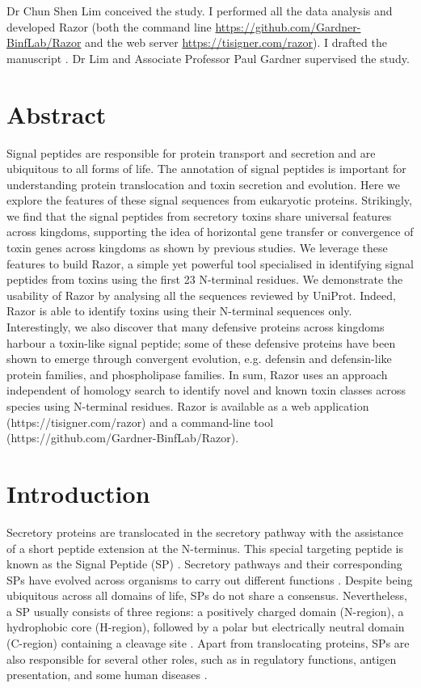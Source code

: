 Dr Chun Shen Lim conceived the study. I performed all the data analysis and developed Razor (both the command line \href{https://github.com/Gardner-BinfLab/Razor}{https://github.com/Gardner-BinfLab/Razor} and the web server \href{https://tisigner.com/razor}{https://tisigner.com/razor}). I drafted the manuscript \cite{Bhandari2020-oj}. Dr Lim and Associate Professor Paul Gardner supervised the study.

\section{Abstract}
Signal peptides are responsible for protein transport and secretion and are ubiquitous to all forms of life. The annotation of signal peptides is important for understanding protein translocation and toxin secretion and evolution. Here we explore the features of these signal sequences from eukaryotic proteins. Strikingly, we find that the signal peptides from secretory toxins share universal features across kingdoms, supporting the idea of horizontal gene transfer or convergence of toxin genes across kingdoms as shown by previous studies. We leverage these features to build Razor, a simple yet powerful tool specialised in identifying signal peptides from toxins using the first 23 N-terminal residues. We demonstrate the usability of Razor by analysing all the sequences reviewed by UniProt. Indeed, Razor is able to identify toxins using their N-terminal sequences only. Interestingly, we also discover that many defensive proteins across kingdoms harbour a toxin-like signal peptide; some of these defensive proteins have been shown to emerge through convergent evolution, e.g. defensin and defensin-like protein families, and phospholipase families. In sum, Razor uses an approach independent of homology search to identify novel and known toxin classes across species using N-terminal residues. Razor is available as a web application (https://tisigner.com/razor) and a command-line tool (https://github.com/Gardner-BinfLab/Razor).



\section{Introduction}
Secretory proteins are translocated in the secretory pathway with the assistance of a short peptide extension at the N-terminus. This special targeting peptide is known as the Signal Peptide (SP) \cite{Von_Heijne1990-sb}. Secretory pathways and their corresponding SPs have evolved across organisms to carry out different functions \cite{Hegde2006-od,Owji2018-hg}. Despite being ubiquitous across all domains of life, SPs do not share a consensus. Nevertheless, a SP usually consists of three regions: a positively charged domain (N-region), a hydrophobic core (H-region), followed by a polar but electrically neutral domain (C-region) containing a cleavage site \cite{Von_Heijne1985-qv,Von_Heijne1990-sb,Nielsen1998-dy}. Apart from translocating proteins, SPs are also responsible for several other roles, such as in regulatory functions, antigen presentation, and some human diseases \cite{Borrego1998-la,Datta2007-av,Owji2018-hg}.

